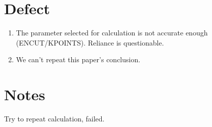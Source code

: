 \section{Defect}
\begin{enumerate}
    \item The parameter selected for calculation is not accurate enough (ENCUT/KPOINTS). Reliance is questionable.
    \item We can't repeat this paper's conclusion.
\end{enumerate}

\section{Notes}
Try to repeat calculation, failed.